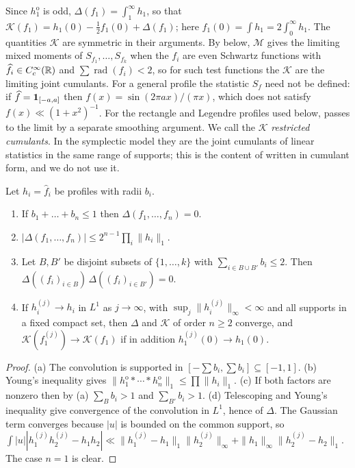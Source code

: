 \documentclass[11pt,colorlinks]{charlie}
\newcommand{\rad}{\operatorname{rad}}
\newcommand{\cM}{\mathcal{M}}
\newcommand{\Ka}{\mathcal{K}}
\newcommand{\ho}[1]{#1^{\mathrm{o}}}
\begin{document}
Since $\ho h_1$ is odd, $\Delta(f_1)=\int_1^\infty h_1$, so that $\Ka(f_1)=h_1(0)-\tfrac12f_1(0)+\Delta(f_1)$; here $f_1(0)=\int h_1=2\int_0^\infty h_1$. The quantities $\Ka$ are symmetric in their arguments. By  below, $\cM$ gives the limiting mixed moments of $S_{f_1},\dots,S_{f_k}$ when the $f_i$ are even Schwartz functions with $\widehat f_i\in C_c^\infty(\mathbb{R})$ and $\sum\rad(f_i)<2$, so for such test functions the $\Ka$ are the limiting joint cumulants. For a general profile the statistic $S_f$ need not be defined: if $\widehat f=\mathbf{1}_{[-a,a]}$ then $f(x)=\sin(2\pi ax)/(\pi x)$, which does not satisfy $f(x)\ll(1+x^2)^{-1}$. For the rectangle and Legendre profiles used below,  passes to the limit by a separate smoothing argument. We call the $\Ka$ \emph{restricted cumulants}. In the symplectic model they are the joint cumulants of linear statistics in the same range of supports; this is the content of \cite[Theorem~7.2]{ERR} written in cumulant form, and we do not use it.

\begin{lemma}\label{lem:cumulant-basic}
Let $h_i=\widehat f_i$ be profiles with radii $b_i$.
\begin{enumerate}[label=(\alph*)]
\item If $b_1+\dots+b_n\le1$ then $\Delta(f_1,\dots,f_n)=0$.
\item $|\Delta(f_1,\dots,f_n)|\le2^{n-1}\prod_i\|h_i\|_1$.
\item Let $B,B'$ be disjoint subsets of $\{1,\dots,k\}$ with $\sum_{i\in B\cup B'}b_i\le2$. Then $\Delta((f_i)_{i\in B})\,\Delta((f_i)_{i\in B'})=0$.
\item If $h_i^{(j)}\to h_i$ in $L^1$ as $j\to\infty$, with $\sup_j\|h_i^{(j)}\|_\infty<\infty$ and all supports in a fixed compact set, then $\Delta$ and $\Ka$ of order $n\ge2$ converge, and $\Ka(f_1^{(j)})\to\Ka(f_1)$ if in addition $h_1^{(j)}(0)\to h_1(0)$.
\end{enumerate}
\end{lemma}
\begin{proof}
(a) The convolution is supported in $[-\sum b_i,\sum b_i]\subseteq[-1,1]$. (b) Young's inequality gives $\|\ho h_1*\cdots*\ho h_n\|_1\le\prod\|h_i\|_1$. (c) If both factors are nonzero then by (a) $\sum_{B}b_i>1$ and $\sum_{B'}b_i>1$. (d) Telescoping and Young's inequality give convergence of the convolution in $L^1$, hence of $\Delta$. The Gaussian term converges because $|u|$ is bounded on the common support, so $\int|u||h_1^{(j)}h_2^{(j)}-h_1h_2|\ll\|h_1^{(j)}-h_1\|_1\|h_2^{(j)}\|_\infty+\|h_1\|_\infty\|h_2^{(j)}-h_2\|_1$. The case $n=1$ is clear.
\end{proof}
\end{document}
